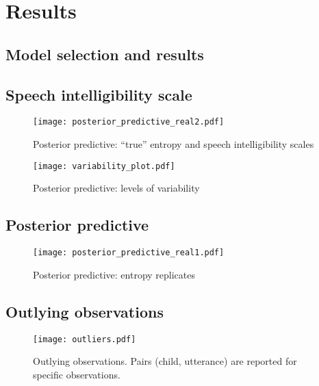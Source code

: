 \section{Results} \label{S:results}
%
\subsection{Model selection and results} \label{sS:results_models}
%

\subsection{Speech intelligibility scale} \label{sS:results_scales}
%

%
\begin{figure}
	\centering
	\texttt{[image: posterior\_predictive\_real2.pdf]}
	\caption[Posterior predictive: ``true'' entropy and intelligibility scales]{Posterior predictive: ``true'' entropy and speech intelligibility scales}
	\label{fig:predictive2}
\end{figure}
%
\begin{figure}
	\centering
	\texttt{[image: variability\_plot.pdf]}
	\caption[Posterior predictive: levels of variability]{Posterior predictive: levels of variability}
	\label{fig:variability}
\end{figure}
%
%
\subsection{Posterior predictive} \label{sS:results_posterior}
%

%
\begin{figure}
	\centering
	\texttt{[image: posterior\_predictive\_real1.pdf]}
	\caption[Posterior predictive: entropy replicates]{Posterior predictive: entropy replicates}
	\label{fig:predictive1}
\end{figure}
%
%
\subsection{Outlying observations} \label{sS:results_outliers}
%

%
\begin{figure}
	\centering
	\texttt{[image: outliers.pdf]}
	\caption[Outlying observations]{Outlying observations. Pairs (child, utterance) are reported for specific observations.}
	\label{fig:outliers}
\end{figure}
%
%



